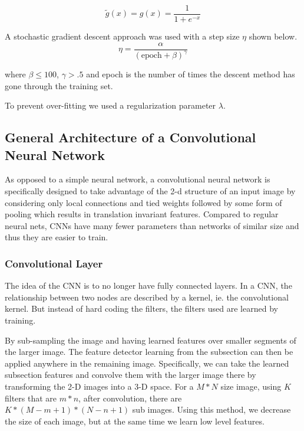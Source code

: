 \documentclass[12pt, twocolumn]{article}
\begin{document}
\begin{equation}
\tilde{g}(x)= g(x) = \frac{1}{ 1+e^{-x}}
\end{equation}

A stochastic gradient descent approach was used with a step size $\eta$ shown below.
\begin{equation}
\eta = \frac{ \alpha}{ (\textrm{epoch} + \beta)^\gamma}
\end{equation}

where $\beta \leq 100$, $\gamma >.5$ and epoch is the number of times the descent method has gone through the training set.  
\newline\newline

To prevent over-fitting we used a regularization parameter $\lambda$. 


\subsection{General Architecture of a Convolutional Neural Network}
As opposed to a simple neural network, a convolutional neural network is specifically designed to take advantage of the 2-d structure of an input image by considering only local connections and tied weights followed by some form of pooling which results in translation invariant features. Compared to regular neural nets,  CNNs  have many fewer parameters than networks of similar size and thus they are easier to train. 



\subsubsection{Convolutional Layer}
The idea of the CNN is to no longer have fully connected layers. In a CNN, the relationship between two nodes are described by a kernel, ie. the convolutional kernel. But instead of hard coding the filters, the filters used are learned by training. 

By sub-sampling the image and having learned features over smaller segments of the larger image. The feature detector learning from the subsection can then be applied anywhere in the remaining image. Specifically, we can take the learned subsection features and convolve them with the larger image there by transforming the 2-D images into a 3-D space. For a  $M * N $ size image, using $K$ filters that are $m * n$,  after convolution, there are  $ K * (M - m + 1) * (N - n + 1) $ sub images. Using this method, we decrease the size of each image, but at the same time we learn low level features. 
\end{document}
